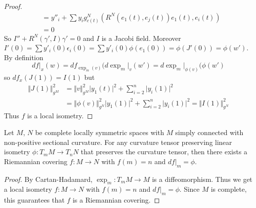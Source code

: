 \documentclass[10pt,a4paper]{article}
\begin{document}
\begin{proof}
\begin{align*}
&= y''_i + \sum y_i g^N_{c(t)}(R^N(e_1(t),e_j(t))e_1(t),e_i(t))\\
&=0
\end{align*}
So $I'' + R^N(\gamma',I)\gamma' = 0$ and $I$ is a Jacobi field. Moreover $I'(0) = \sum y'_i(0) \epsilon_i(0) = \sum y'_i(0) \phi(e_1(0))  = \phi(J'(0)) = \phi(w')$.\\
By definition
\[df\vert_x(w) = df_{\exp_m(v)}(d\exp_m\vert_v(w') = d\exp_m\vert_{\phi(v)}(\phi(w')\] 
so $df_x(J(1)) = I(1)$ but 
\begin{align*}
\Vert J(1)\Vert_{g^M}^2 &= \Vert v\Vert_{g^M}^2\vert y_1(t)\vert^2 + \sum_{i=2}^n\vert y_i(1)\vert^2 \\
&= \Vert\phi(v)\Vert^2_{g^N}\vert y_1(1)\vert^2 + \sum_{i=2}^n \vert y_i(1)\vert^2 = \Vert I(1)\Vert^2_{g^N}
\end{align*}
Thus $f$ is a local isometry.
\end{proof}

\begin{corollary}
Let $M$, $N$ be complete locally symmetric spaces with $M$ simply connected with non-positive sectional curvature. For any curvature tensor preserving linear isometry $\phi:T_mM\to T_nN$ that preserves the curvature tensor, then there exists a Riemannian covering $f:M\to N$ with $f(m)=n$ and $df\vert_m = \phi$.
\end{corollary}
\begin{proof}
By Cartan-Hadamard, $\exp_m:T_mM\to M$ is a diffeomorphism. Thus we get a local isometry $f:M\to N$ with $f(m)=n$ and $df\vert_m = \phi$. Since $M$ is complete, this guarantees that $f$ is a Riemannian covering.
\end{proof}
\end{document}
